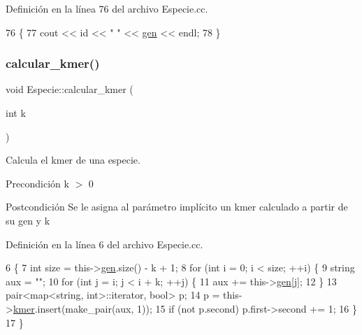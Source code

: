 Definición en la línea 76 del archivo Especie.\+cc.


\begin{DoxyCode}
76                                      \{
77   cout << \textcolor{keywordtype}{id} << \textcolor{stringliteral}{" "} << \hyperlink{class_especie_ac35bb565f7346cd6317b3a8c849456d1}{gen} << endl;
78 \}
\end{DoxyCode}
\mbox{\label{class_especie_a83fdef791142b0887bfa7f45bd0d5e0e}} 
\subsubsection{\texorpdfstring{calcular\+\_\+kmer()}{calcular\_kmer()}}
{\footnotesize\ttfamily void Especie\+::calcular\+\_\+kmer (\begin{DoxyParamCaption}\item[{int}]{k }\end{DoxyParamCaption})\hspace{0.3cm}{\ttfamily [private]}}



Calcula el kmer de una especie. 

\begin{DoxyPrecond}{Precondición}
k $>$ 0 
\end{DoxyPrecond}
\begin{DoxyPostcond}{Postcondición}
Se le asigna al parámetro implícito un kmer calculado a partir de su \textquotesingle{}gen\textquotesingle{} y k 
\end{DoxyPostcond}


Definición en la línea 6 del archivo Especie.\+cc.


\begin{DoxyCode}
6                                  \{
7   \textcolor{keywordtype}{int} size = this->\hyperlink{class_especie_ac35bb565f7346cd6317b3a8c849456d1}{gen}.size() - k + 1;
8   \textcolor{keywordflow}{for} (\textcolor{keywordtype}{int} i = 0; i < size; ++i) \{
9     \textcolor{keywordtype}{string} aux = \textcolor{stringliteral}{""};
10     \textcolor{keywordflow}{for} (\textcolor{keywordtype}{int} j = i; j < i + k; ++j) \{
11       aux += this->\hyperlink{class_especie_ac35bb565f7346cd6317b3a8c849456d1}{gen}[j];
12     \}
13     pair<map<string, int>::iterator, \textcolor{keywordtype}{bool}> p;
14     p = this->\hyperlink{class_especie_aa438e3e2f785d96c0ac51e83f60a5879}{kmer}.insert(make\_pair(aux, 1));
15     \textcolor{keywordflow}{if} (not p.second) p.first->second += 1;
16   \}
17 \}
\end{DoxyCode}



